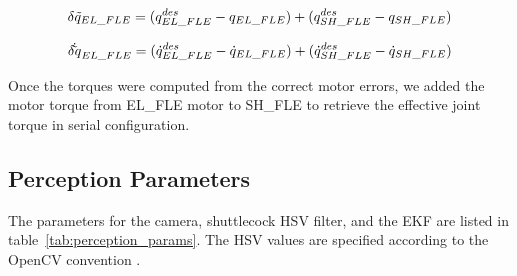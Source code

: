 \documentclass[9pt,twocolumn,twoside]{osajnl}
\begin{document}
\begin{equation}
    \delta \Tilde{q}_{EL\_FLE} = (q^{des}_{EL\_FLE}-q_{EL\_FLE}) + (q^{des}_{SH\_FLE}-q_{SH\_FLE})
\end{equation}

\begin{equation}
    \delta {\Dot\Tilde{q}}_{EL\_FLE} = (\Dot{q}^{des}_{EL\_FLE}-\Dot{q}_{EL\_FLE}) + (\Dot{q}^{des}_{SH\_FLE}-\Dot{q}_{SH\_FLE})
\end{equation}

Once the torques were computed from the correct motor errors, we added the motor torque from EL\_FLE motor to SH\_FLE to retrieve the effective joint torque in serial configuration.

\subsection*{Perception Parameters}

The parameters for the camera, shuttlecock \ac{HSV} filter, and the \ac{EKF} are listed in table~\ref{tab:perception_params}. The \ac{HSV} values are specified according to the OpenCV convention \cite{opencv_library}.
\end{document}
